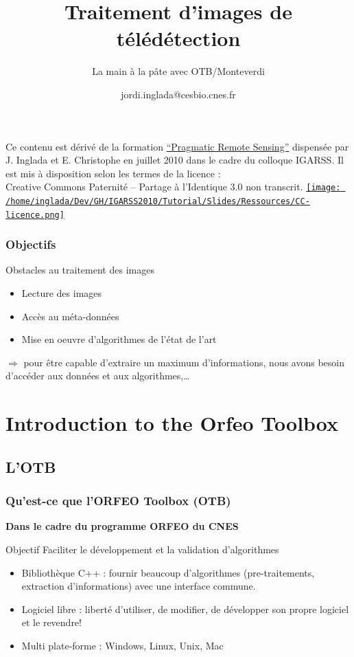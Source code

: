\documentclass[compress]{beamer}
\title{Traitement d'images de télédétection}
\subtitle{La main à la pâte avec OTB/Monteverdi} %
\author
{jordi.inglada@cesbio.cnes.fr}
\institute[Cesbio] %
{\textsc{Centre d'Études Spatiales de la Biosphère, Toulouse, France}}
\date{}
\begin{document}
\begin{frame}
  \titlepage
  \begin{center}
{\tiny Ce contenu est dérivé de la formation \href{http://www.orfeo-toolbox.org/packages/PragmaticRemoteSensing-handout.pdf}{``Pragmatic Remote
  Sensing''} dispensée par J. Inglada et E. Christophe en juillet 2010
  dans le cadre du colloque IGARSS. Il est mis à disposition selon les termes de la licence :\\
Creative Commons Paternité – Partage à l’Identique 3.0 non transcrit.} \href{http://creativecommons.org/licenses/by-sa/3.0/}{\texttt{[image: /home/inglada/Dev/GH/IGARSS2010/Tutorial/Slides/Ressources/CC-licence.png]}}    
  \end{center}

\end{frame}

\begin{frame}
\frametitle{Objectifs}
\begin{block}{Obstacles au traitement des images}
\begin{itemize}
 \item Lecture des images
 \item Accès au méta-données
 \item Mise en oeuvre d'algorithmes de l'état de l'art
\end{itemize}
\end{block}
$\Rightarrow$ pour être capable \alert{d'extraire un maximum
  d'informations}, nous avons besoin \alert{d'accéder} aux données et
aux algorithmes,\ldots
\end{frame}


\section{Introduction to the Orfeo Toolbox}



\subsection{L'OTB}
\begin{frame}
\frametitle{Qu'est-ce que l'ORFEO Toolbox (OTB)}

\textbf{Dans le cadre du programme ORFEO du CNES}
\begin{alertblock}{Objectif}
Faciliter le développement et la validation d'algorithmes
\end{alertblock}
\begin{block}{}
\begin{itemize}
 \item Bibliothèque C++ : fournir beaucoup d'algorithmes
   (pre-traitements, extraction d'informations) avec une interface commune.
 \item Logiciel libre : liberté d'utiliser, de modifier, de développer
   son propre logiciel et le revendre!
 \item Multi plate-forme : Windows, Linux, Unix, Mac
\end{itemize}
\end{block}
\end{frame}
\end{document}
